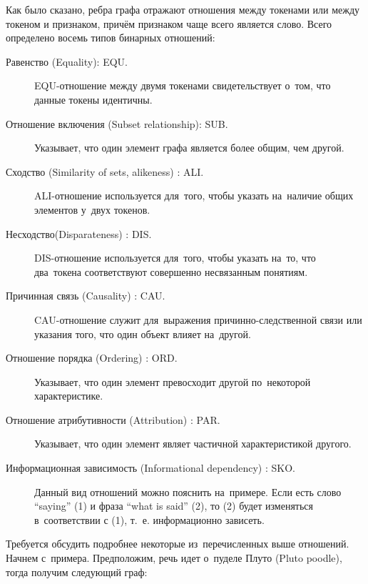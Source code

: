 Как было сказано, ребра графа отражают отношения между токенами или между токеном и признаком, 
причём признаком чаще всего является слово. 
Всего определено восемь типов бинарных отношений:

\begin{description}

\item[Равенство (Equality): EQU.]
EQU-отношение между двумя токенами свидетельствует о~том, 
что данные токены идентичны.

\item [Отношение включения (Subset relationship): SUB.]
Указывает, что один элемент графа является более общим, чем другой.

\item[Сходство (Similarity of sets, alikeness) : ALI.]
ALI-отношение используется для~того, 
чтобы указать на~наличие общих элементов у~двух токенов.

\item[Несходство(Disparateness) : DIS.]
DIS-отношение используется для~того, чтобы указать на~то, 
что два~токена соответствуют совершенно несвязанным понятиям.

\item[Причинная связь (Causality) : CAU.]
CAU-отношение служит для~выражения причинно-следственной связи или
указания того, что один объект влияет на~другой. 

\item[Отношение порядка (Ordering) : ORD.]
Указывает, что один элемент превосходит другой по~некоторой характеристике.

\item[Отношение атрибутивности (Attribution) : PAR.]

Указывает, что один элемент являет частичной характеристикой другого.

\item[Информационная зависимость (Informational dependency) : SKO.]
Данный вид отношений можно пояснить на~примере. 
Если есть слово ``saying'' (1) и фраза ``what is said'' (2), 
то (2) будет изменяться в~соответствии с (1), т.~е. 
информационно зависеть.

\end{description}

Требуется обсудить подробнее некоторые из~перечисленных выше отношений. 
Начнем с~примера. 
Предположим, речь идет о~пуделе Плуто (Pluto poodle),
 тогда получим следующий граф:

